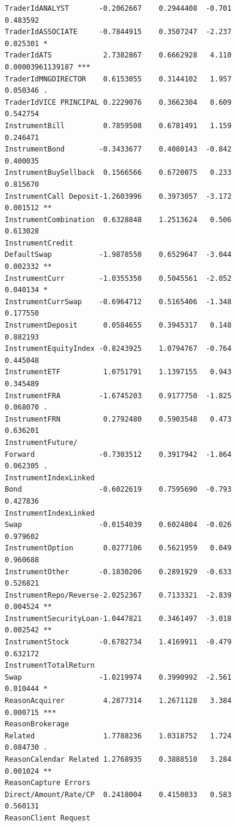 \documentclass[
]{article}
\begin{document}
\begin{verbatim}
TraderIdANALYST       -0.2062667    0.2944408  -0.701             0.483592    
TraderIdASSOCIATE     -0.7844915    0.3507247  -2.237             0.025301 *  
TraderIdATS            2.7382867    0.6662928   4.110     0.00003961139187 ***
TraderIdMNGDIRECTOR    0.6153055    0.3144102   1.957             0.050346 .  
TraderIdVICE PRINCIPAL 0.2229076    0.3662304   0.609             0.542754    
InstrumentBill         0.7859508    0.6781491   1.159             0.246471    
InstrumentBond        -0.3433677    0.4080143  -0.842             0.400035    
InstrumentBuySellback  0.1566566    0.6720075   0.233             0.815670    
InstrumentCall Deposit-1.2603996    0.3973057  -3.172             0.001512 ** 
InstrumentCombination  0.6328848    1.2513624   0.506             0.613028    
InstrumentCredit
DefaultSwap           -1.9878550    0.6529647  -3.044             0.002332 ** 
InstrumentCurr        -1.0355350    0.5045561  -2.052             0.040134 *  
InstrumentCurrSwap    -0.6964712    0.5165406  -1.348             0.177550    
InstrumentDeposit      0.0584655    0.3945317   0.148             0.882193    
InstrumentEquityIndex -0.8243925    1.0794767  -0.764             0.445048    
InstrumentETF          1.0751791    1.1397155   0.943             0.345489    
InstrumentFRA         -1.6745203    0.9177750  -1.825             0.068070 .  
InstrumentFRN          0.2792480    0.5903548   0.473             0.636201    
InstrumentFuture/
Forward               -0.7303512    0.3917942  -1.864             0.062305 .  
InstrumentIndexLinked
Bond                  -0.6022619    0.7595690  -0.793             0.427836    
InstrumentIndexLinked
Swap                  -0.0154039    0.6024804  -0.026             0.979602    
InstrumentOption       0.0277106    0.5621959   0.049             0.960688    
InstrumentOther       -0.1830206    0.2891929  -0.633             0.526821    
InstrumentRepo/Reverse-2.0252367    0.7133321  -2.839             0.004524 ** 
InstrumentSecurityLoan-1.0447821    0.3461497  -3.018             0.002542 ** 
InstrumentStock       -0.6782734    1.4169911  -0.479             0.632172    
InstrumentTotalReturn
Swap                  -1.0219974    0.3990992  -2.561             0.010444 *  
ReasonAcquirer         4.2877314    1.2671128   3.384             0.000715 ***
ReasonBrokerage 
Related                1.7788236    1.0318752   1.724             0.084730 .  
ReasonCalendar Related 1.2768935    0.3888510   3.284             0.001024 ** 
ReasonCapture Errors    
Direct/Amount/Rate/CP  0.2418004    0.4150033   0.583             0.560131  
ReasonClient Request

\end{verbatim}
\end{document}
